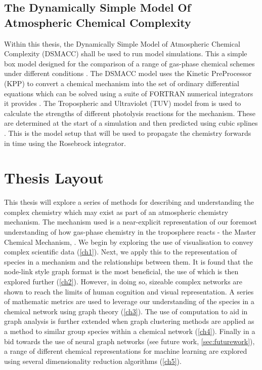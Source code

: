  \subsection{The Dynamically Simple Model Of Atmospheric Chemical Complexity}

Within this thesis, the Dynamically Simple Model of Atmospheric Chemical Complexity (DSMACC) shall be used to run model simulations. This a simple box model designed for the comparison of a range of gas-phase chemical schemes under different conditions \citep{dsmacc}.
 The DSMACC model uses the Kinetic PreProcessor (KPP) to convert a chemical mechanism into the set of ordinary differential equations which can be solved using a suite of FORTRAN numerical integrators it provides \citep{kpp}. The Tropospheric and Ultraviolet (TUV) model from \cite{tuv} is used to calculate the strengths of different photolysis reactions for the mechanism. These are determined at the start of a simulation and then predicted using cubic splines \citep{dsmaccgit}. This is the model setup that will be used to propagate the chemistry forwards in time using the Rosebrock integrator. 






\section{Thesis Layout}
This thesis will explore a series of methods for describing and understanding the complex chemistry which may exist as part of an atmospheric chemistry mechanism. The mechanism used is a near-explicit representation of our foremost understanding of how gas-phase chemistry in the troposphere reacts - the Master Chemical Mechanism, \citep{mcm}.
We begin by exploring the use of visualisation to convey complex scientific data (\autoref{ch1}). Next, we apply this to the representation of species in a mechanism and the relationships between them. It is found that the node-link style graph format is the most beneficial, the use of which is then explored further (\autoref{ch2}).
However, in doing so, sizeable complex networks are shown to reach the limits of human cognition and visual representation. A series of mathematic metrics are used to leverage our understanding of the species in a chemical network using graph theory (\autoref{ch3}). The use of computation to aid in graph analysis is further extended when graph clustering methods are applied as a method to similar group species within a chemical network (\autoref{ch4}). Finally in a bid towards the use of neural graph networks (see future work, \autoref{sec:futurework}), a range of different chemical representations for machine learning are explored using several dimensionality reduction algorithms (\autoref{ch5}).

